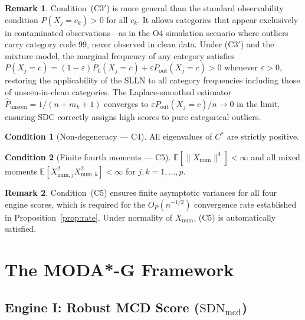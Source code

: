 \documentclass[11pt]{article}
\theoremstyle{plain}
\theoremstyle{definition}
\newtheorem{condition}{Condition}
\newtheorem{remark}{Remark}
\newcommand{\E}{\mathbb{E}}
\begin{document}
\begin{remark}
\label{rem:c3}
Condition~(C3$'$) is more general than the standard
observability condition $P(X_j = c_k) > 0$ for all $c_k$.
It allows categories that appear exclusively in contaminated
observations---as in the O4 simulation scenario where
outliers carry category code 99, never observed in clean
data. Under (C3$'$) and the mixture model, the marginal
frequency of any category satisfies
$P(X_j = c) = (1-\varepsilon) P_0(X_j = c) +
\varepsilon P_\text{out}(X_j = c) > 0$
whenever $\varepsilon > 0$, restoring the applicability
of the SLLN to all category frequencies including
those of unseen-in-clean categories.
The Laplace-smoothed estimator
$\hat{P}_\text{unseen} = 1/(n + m_k + 1)$ converges
to $\varepsilon P_\text{out}(X_j = c)/n \to 0$ in
the limit, ensuring SDC correctly assigns high scores
to pure categorical outliers.
\end{remark}

\begin{condition}[Non-degeneracy --- C4]
All eigenvalues of $C^*$ are strictly positive.
\end{condition}

\begin{condition}[Finite fourth moments --- C5]
\label{cond:c5}
$\E[\|X_\text{num}\|^4] < \infty$ and all mixed moments
$\E[X_{\text{num},j}^2 X_{\text{num},k}^2] < \infty$
for $j, k = 1, \ldots, p$.
\end{condition}

\begin{remark}
Condition~(C5) ensures finite asymptotic variances for
all four engine scores, which is required for the
$O_P(n^{-1/2})$ convergence rate established in
Proposition~\ref{prop:rate}. Under normality of
$X_\text{num}$, (C5) is automatically satisfied.
\end{remark}

\section{The MODA*-G Framework}
\label{sec:framework}

\subsection{Engine I: Robust MCD Score
  ($\text{SDN}_\text{mcd}$)}
\label{sec:engine1}
\end{document}

